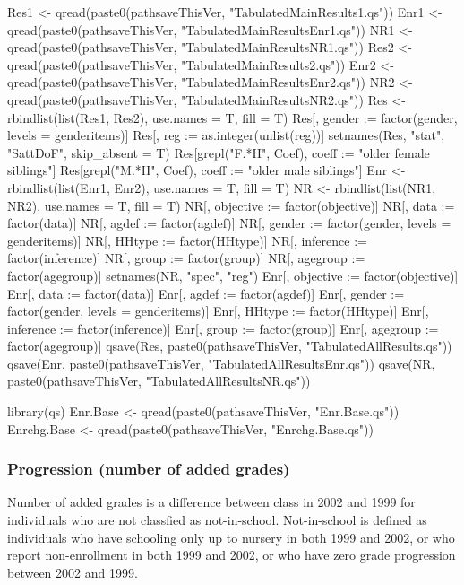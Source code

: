 \begin{Schunk}
\begin{Sinput}
Res1 <- qread(paste0(pathsaveThisVer, "TabulatedMainResults1.qs"))
Enr1 <- qread(paste0(pathsaveThisVer, "TabulatedMainResultsEnr1.qs"))
NR1 <- qread(paste0(pathsaveThisVer, "TabulatedMainResultsNR1.qs"))
Res2 <- qread(paste0(pathsaveThisVer, "TabulatedMainResults2.qs"))
Enr2 <- qread(paste0(pathsaveThisVer, "TabulatedMainResultsEnr2.qs"))
NR2 <- qread(paste0(pathsaveThisVer, "TabulatedMainResultsNR2.qs"))
Res <- rbindlist(list(Res1, Res2), use.names = T, fill = T)
Res[, gender := factor(gender, levels = genderitems)]
Res[, reg := as.integer(unlist(reg))]
setnames(Res, "stat", "SattDoF", skip_absent = T)
Res[grepl("F.*H", Coef), coeff := "older female siblings"]
Res[grepl("M.*H", Coef), coeff := "older male siblings"]
Enr <- rbindlist(list(Enr1, Enr2), use.names = T, fill = T)
NR <- rbindlist(list(NR1, NR2), use.names = T, fill = T)
NR[, objective := factor(objective)]
NR[, data := factor(data)]
NR[, agdef := factor(agdef)]
NR[, gender := factor(gender, levels = genderitems)]
NR[, HHtype := factor(HHtype)]
NR[, inference := factor(inference)]
NR[, group := factor(group)]
NR[, agegroup := factor(agegroup)]
setnames(NR, "spec", "reg")
Enr[, objective := factor(objective)]
Enr[, data := factor(data)]
Enr[, agdef := factor(agdef)]
Enr[, gender := factor(gender, levels = genderitems)]
Enr[, HHtype := factor(HHtype)]
Enr[, inference := factor(inference)]
Enr[, group := factor(group)]
Enr[, agegroup := factor(agegroup)]
qsave(Res, paste0(pathsaveThisVer, "TabulatedAllResults.qs"))
qsave(Enr, paste0(pathsaveThisVer, "TabulatedAllResultsEnr.qs"))
qsave(NR, paste0(pathsaveThisVer, "TabulatedAllResultsNR.qs"))
\end{Sinput}
\end{Schunk}




\begin{Schunk}
\begin{Sinput}
library(qs)
Enr.Base <- qread(paste0(pathsaveThisVer, "Enr.Base.qs"))
Enrchg.Base <- qread(paste0(pathsaveThisVer, "Enrchg.Base.qs"))
\end{Sinput}
\end{Schunk}

\subsubsection{Progression (number of added grades)}

Number of added grades is a difference between class in 2002 and 1999 for individuals who are not classfied as not-in-school. Not-in-school is defined as individuals who have schooling only up to nursery in both 1999 and 2002, or who report non-enrollment in both 1999 and 2002, or who have zero grade progression between 2002 and 1999. 

